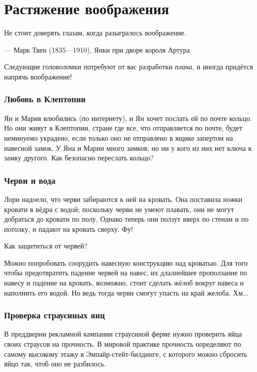 \chapter{Растяжение воображения}


\setlength{\epigraphwidth}{.80\textwidth}
\epigraph{Не стоит доверять глазам, когда разыгралось воображение.
}{--- Марк Твен (1835---1910), Янки при дворе короля Артура}

Следующие головоломки потребуют от вас разработки \emph{плана},
и иногда придётся напрячь воображение!

\subsection*{Любовь в Клептопии}\label{Любовь в Клептопии}

Ян и Мария влюбились (по интернету), и Ян хочет послать ей по почте кольцо.
Но они живут в Клептопии, стране где все, что отправляется по почте, будет неминуемо украдено, если только оно не отправлено в ящике запертом на навесной замок.
У Яна и Марии много замков, но ни у кого из них нет ключа к замку другого.
Как безопасно переслать кольцо?

\subsection*{Черви и вода}\label{Черви и вода}

Лори надоело, что черви забираются к ней на кровать.
Она поставила ножки кровати в вёдра с водой;
поскольку черви не умеют плавать, они не могут добраться до кровати по полу.
Однако теперь они ползут вверх по стенам и по потолку, и падают на кровать сверху.
Фу!

Как защититься от червей?

Можно попробовать соорудить навесную конструкцию над кроватью.
Для того чтобы предотвратить падение червей на навес,
их длалнейшее проползание по навесу
и падение на кровать, возможно, стоит сделать жёлоб вокруг навеса и наполнить его водой.
Но ведь тогда черви смогут упасть на край желоба.
Хм...

\subsection*{Проверка страусиных яиц}

В преддверии рекламной кампании страусиной ферме нужно проверить яйца своих страусов на прочность.
В мировой практике прочность определяют по самому высокому этажу в Эмпайр-стейт-билдинге, с которого можно сбросить яйцо так, чтоб оно не разбилось.

